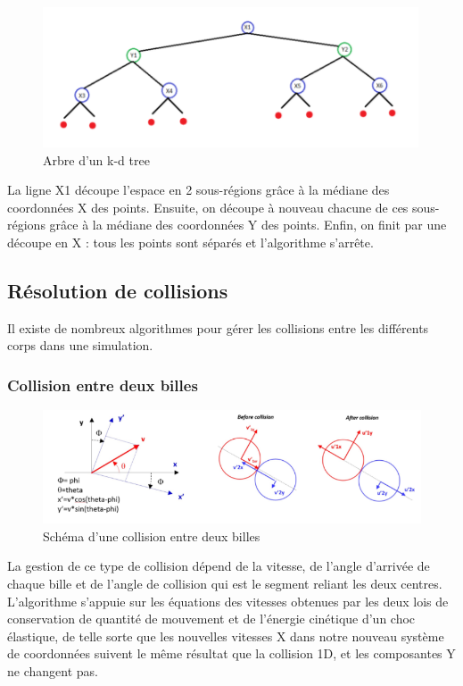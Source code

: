 \documentclass{report}
\begin{document}
\begin{figure}[H]
\centering
\includegraphics[scale=0.6]{arbre_kdtree.png}
\caption{Arbre d'un k-d tree}
\end{figure}

La ligne X1 découpe l’espace en 2 sous-régions grâce à la médiane des coordonnées X des points. Ensuite, on découpe à nouveau chacune de ces sous-régions grâce à la médiane des coordonnées Y des points. Enfin, on finit par une découpe en X : tous les points sont séparés et l’algorithme s’arrête.

\newpage
\subsection{Résolution de collisions}

Il existe de nombreux algorithmes pour gérer les collisions entre les différents corps dans une simulation.

\subsubsection{Collision entre deux billes}

\begin{figure}[H]
\centering
\includegraphics[scale=0.9]{collision_bille_bille.png}
\caption{Schéma d'une collision entre deux billes}
\end{figure}

La gestion de ce type de collision dépend de la vitesse, de l’angle d’arrivée de chaque bille et de l’angle de collision qui est le segment reliant les deux centres. \\

L’algorithme s'appuie sur les équations des vitesses obtenues par les deux lois de conservation de quantité de mouvement et de l’énergie cinétique d’un choc élastique, de telle sorte que les nouvelles vitesses X dans notre nouveau système de coordonnées suivent le même résultat que la collision 1D, et les composantes Y ne changent pas. \\
\end{document}
